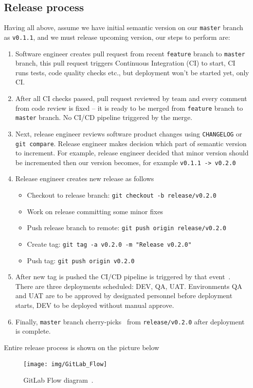 \subsection{Release process}
Having all above, assume we have initial semantic version on our \texttt{master} branch as \texttt{v0.1.1},
and we must release upcoming version, our steps to perform are:
\begin{enumerate}
    \item Software engineer creates pull request from recent \texttt{feature} branch to \texttt{master} branch,
    this pull request triggers Continuous Integration (CI) to start, CI runs tests, code quality checks etc.,
    but deployment won't be started yet, only CI\@.
    \item After all CI checks passed, pull request reviewed by team and every comment from code review is fixed --
    it is ready to be merged from \texttt{feature} branch to \texttt{master} branch.
    No CI/CD pipeline triggered by the merge.
    \item Next, release engineer reviews software product changes using \texttt{CHANGELOG} or \texttt{git compare}.
    Release engineer makes decision which part of semantic version to increment.
    For example, release engineer decided that minor version should be incremented then our version becomes,
    for example \texttt{v0.1.1 -> v0.2.0}
    \item Release engineer creates new release as follows
    \begin{itemize}
        \item Checkout to release branch: \texttt{git checkout -b release/v0.2.0}
        \item Work on release committing some minor fixes
        \item Push release branch to remote: \texttt{git push origin release/v0.2.0}
        \item Create tag: \texttt{git tag -a v0.2.0 -m "Release v0.2.0"}
        \item Push tag: \texttt{git push origin v0.2.0}
    \end{itemize}
    \item After new tag is pushed the CI/CD pipeline is triggered by that event~\cite{AzurePipelinesTriggers}.
    There are three deployments scheduled: DEV, QA, UAT\@.
    Environments QA and UAT are to be approved by designated personnel before deployment starts,
    DEV to be deployed without manual approve.
    \item Finally, \texttt{master} branch cherry-picks~\cite{CherryPick} from \texttt{release/v0.2.0} after deployment is complete.
\end{enumerate}
Entire release process is shown on the picture below
\begin{figure}[H]
    \centering
    \texttt{[image: img/GitLab\_Flow]}
    ~\caption{GitLab Flow diagram~\cite{GitLabFlow}.}
\end{figure}

